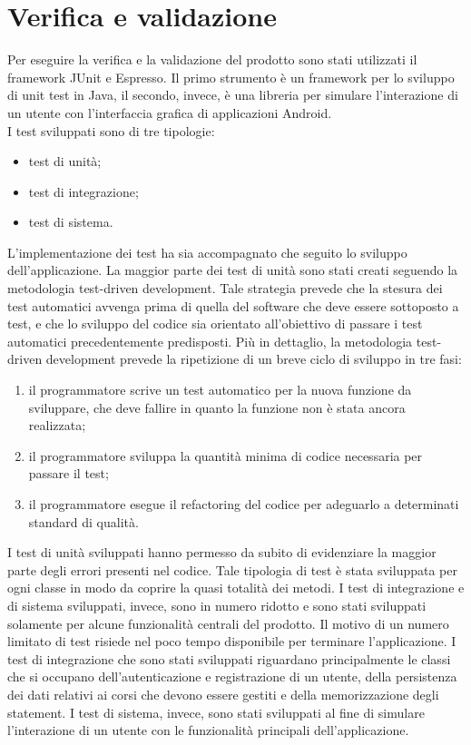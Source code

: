 \documentclass[../Tesi.tex]{subfiles}
\begin{document}
\section{Verifica e validazione}
	Per eseguire la verifica e la validazione del prodotto sono stati utilizzati il framework JUnit e Espresso. Il primo strumento è un framework per lo sviluppo di unit test in Java, il secondo, invece, è una libreria per 
	simulare l'interazione di un utente con l'interfaccia grafica di applicazioni Android. \\
	I test sviluppati sono di tre tipologie:
	\begin{itemize}
		\item test di unità;
		\item test di integrazione;
		\item test di sistema.
	\end{itemize}
	L'implementazione dei test ha sia accompagnato che seguito lo sviluppo dell'applicazione. La maggior parte dei test di unità sono stati creati seguendo la metodologia test-driven development. Tale strategia prevede che la stesura dei test automatici avvenga prima di quella del software che deve essere sottoposto a test, e che lo sviluppo del codice sia orientato all'obiettivo di passare i test automatici precedentemente predisposti. Più in dettaglio, la metodologia test-driven development prevede la ripetizione di un breve ciclo di sviluppo in tre fasi:
	\begin{enumerate}
		\item il programmatore scrive un test automatico per la nuova funzione da sviluppare, che deve fallire in quanto la funzione non è stata ancora realizzata;
		\item il programmatore sviluppa la quantità minima di codice necessaria per passare il test;
		\item il programmatore esegue il refactoring del codice per adeguarlo a determinati standard di qualità.
	\end{enumerate}
	I test di unità sviluppati hanno permesso da subito di evidenziare la maggior parte degli errori presenti nel codice. Tale tipologia di test è stata sviluppata per ogni classe in modo da coprire la quasi totalità dei metodi. I test di integrazione e di sistema sviluppati, invece, sono in numero ridotto e sono stati sviluppati solamente per alcune funzionalità centrali del prodotto. Il motivo di un numero limitato di test risiede nel poco tempo disponibile per terminare l'applicazione. I test di integrazione che sono stati sviluppati riguardano principalmente le classi che si occupano dell'autenticazione e registrazione di un utente, della persistenza dei dati relativi ai corsi che devono essere gestiti e della memorizzazione degli statement. I test di sistema, invece, sono stati sviluppati al fine di simulare l'interazione di un utente con le funzionalità principali dell'applicazione.\\
\end{document}
